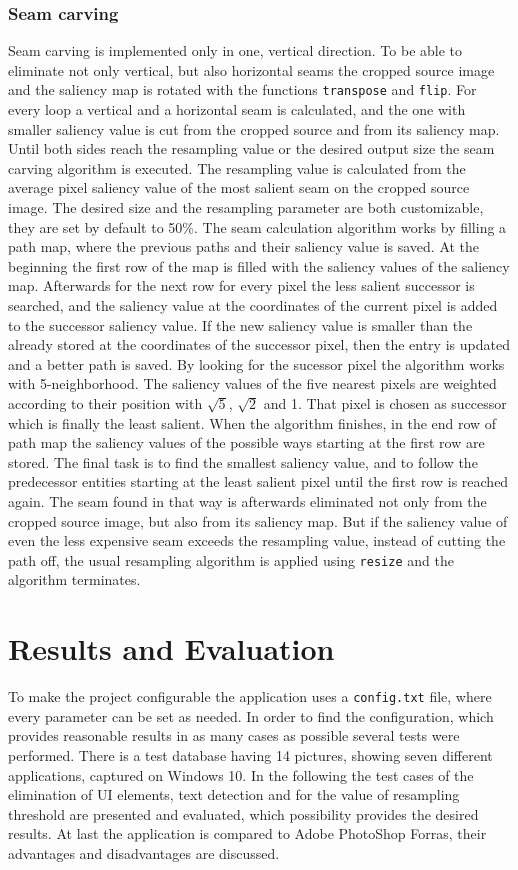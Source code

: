 \documentclass[draft,final]{vutinfth} %
\begin{document}
	\subsection{Seam carving}
	Seam carving is implemented only in one, vertical direction. 
	To be able to eliminate not only vertical, but also horizontal seams the cropped source image and the saliency map is rotated with the functions \texttt{transpose} and \texttt{flip}.
	For every loop a vertical and a horizontal seam is calculated, and the one with smaller saliency value is cut from the cropped source and from its saliency map.
	Until both sides reach the resampling value or the desired output size the seam carving algorithm is executed.
	The resampling value is calculated from the average pixel saliency value of the most salient seam on the cropped source image.
	The desired size and the resampling parameter are both customizable, they are set by default to 50\%. 
	The seam calculation algorithm works by filling a path map, where the previous paths and their saliency value is saved.
	At the beginning the first row of the map is filled with the saliency values of the saliency map.
	Afterwards for the next row for every pixel the less salient successor is searched, and the saliency value at the coordinates of the current pixel is added to the successor saliency value.
	If the new saliency value is smaller than the already stored at the coordinates of the successor pixel, then the entry is updated and a better path is saved.
	By looking for the sucessor pixel the algorithm works with 5-neighborhood. 
	The saliency values of the five nearest pixels are weighted according to their position with $\sqrt{5}$, $\sqrt{2}$ and 1.
	That pixel is chosen as successor which is finally the least salient.
	When the algorithm finishes, in the end row of path map the saliency values of the possible ways starting at the first row are stored.
	The final task is to find the smallest saliency value, and to follow the predecessor entities starting at the least salient pixel until the first row is reached again.
	The seam found in that way is afterwards eliminated not only from the cropped source image, but also from its saliency map.
	But if the saliency value of even the less expensive seam exceeds the resampling value, instead of cutting the path off, the usual resampling algorithm is applied using \texttt{resize} and the algorithm terminates.  
	
	\chapter{Results and Evaluation}
	To make the project configurable the application uses a \texttt{config.txt} file, where every parameter can be set as needed.
	In order to find the configuration, which provides reasonable results in as many cases as possible several tests were performed.
	There is a test database having 14 pictures, showing seven different applications, captured on Windows 10.
	In the following the test cases of the elimination of UI elements, text detection and for the value of resampling threshold are presented and evaluated, which possibility provides the desired results.
	At last the application is compared to Adobe PhotoShop Forras, their advantages and disadvantages are discussed.
\end{document}
